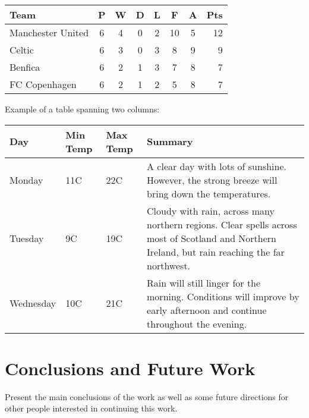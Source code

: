 \documentclass[10pt,twocolumn,letterpaper]{article}
\begin{document}
\begin{table}
\begin{center}
\begin{tabular}{l*{6}{c}r}
Team              & P & W & D & L & F  & A & Pts \\
\hline
Manchester United & 6 & 4 & 0 & 2 & 10 & 5 & 12  \\
Celtic            & 6 & 3 & 0 & 3 &  8 & 9 &  9  \\
Benfica           & 6 & 2 & 1 & 3 &  7 & 8 &  7  \\
FC Copenhagen     & 6 & 2 & 1 & 2 &  5 & 8 &  7  \\
\end{tabular}
\end{center}
\end{table}

Example of a table spanning two columns: 

\begin{table*}
\begin{center}
    \begin{tabular}{ | l | l | l | p{8cm} |}
    \hline
    Day & Min Temp & Max Temp & Summary \\ \hline
    Monday & 11C & 22C & A clear day with lots of sunshine.  
    However, the strong breeze will bring down the temperatures. \\ \hline
    Tuesday & 9C & 19C & Cloudy with rain, across many northern regions. Clear spells
    across most of Scotland and Northern Ireland,
    but rain reaching the far northwest. \\ \hline
    Wednesday & 10C & 21C & Rain will still linger for the morning.
    Conditions will improve by early afternoon and continue
    throughout the evening. \\
    \hline
    \end{tabular}
\end{center}    
\end{table*}

\section{Conclusions and Future Work}
Present the main conclusions of the work as well as some future directions for other people interested in continuing this work. 

{\small


}
\end{document}
